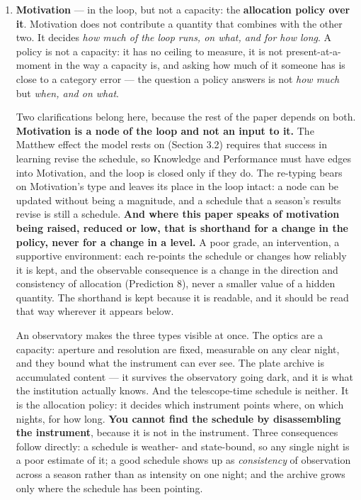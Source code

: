 \documentclass[12pt,a4paper]{article}
\begin{document}
\begin{enumerate}
\item \textbf{Motivation} ---\hspace{0pt} in the loop, but not a capacity: the \textbf{allocation policy over it}. Motivation does not contribute a quantity that combines with the other two. It decides \emph{how much of the loop runs, on what, and for how long}. A policy is not a capacity: it has no ceiling to measure, it is not present-at-a-moment in the way a capacity is, and asking how much of it someone has is close to a category error ---\hspace{0pt} the question a policy answers is not \emph{how much} but \emph{when, and on what}.

Two clarifications belong here, because the rest of the paper depends on both. \textbf{Motivation is a node of the loop and not an input to it.} The Matthew effect the model rests on (Section 3.2) requires that success in learning revise the schedule, so Knowledge and Performance must have edges into Motivation, and the loop is closed only if they do. The re-typing bears on Motivation's type and leaves its place in the loop intact: a node can be updated without being a magnitude, and a schedule that a season's results revise is still a schedule. \textbf{And where this paper speaks of motivation being raised, reduced or low, that is shorthand for a change in the policy, never for a change in a level.} A poor grade, an intervention, a supportive environment: each re-points the schedule or changes how reliably it is kept, and the observable consequence is a change in the direction and consistency of allocation (Prediction 8), never a smaller value of a hidden quantity. The shorthand is kept because it is readable, and it should be read that way wherever it appears below.

An observatory makes the three types visible at once. The optics are a capacity: aperture and resolution are fixed, measurable on any clear night, and they bound what the instrument can ever see. The plate archive is accumulated content ---\hspace{0pt} it survives the observatory going dark, and it is what the institution actually knows. And the telescope-time schedule is neither. It is the allocation policy: it decides which instrument points where, on which nights, for how long. \textbf{You cannot find the schedule by disassembling the instrument}, because it is not in the instrument. Three consequences follow directly: a schedule is weather- and state-bound, so any single night is a poor estimate of it; a good schedule shows up as \emph{consistency} of observation across a season rather than as intensity on one night; and the archive grows only where the schedule has been pointing.


\end{enumerate}
\end{document}
